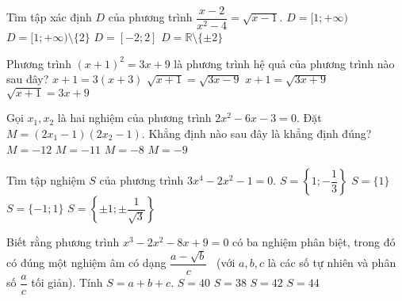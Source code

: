 \begin{ex}%
	Tìm tập xác định $D$ của phương trình $\dfrac{x-2}{x^2-4}=\sqrt{x-1}$.
	\choice
	{$D=[1;+\infty)$}
	{\True $D=[1;+\infty)\setminus \{2\}$}
	{$D=[-2;2]$}
	{$D=\mathbb{R}\setminus \{\pm2\}$}
\end{ex}
\begin{ex}%
	Phương trình $(x+1)^2=3x+9$ là phương trình hệ quả của phương trình nào sau đây?
	\choice
	{$x+1=3(x+3)$}
	{$\sqrt{x+1}=\sqrt{3x-9}$}
	{\True $x+1=\sqrt{3x+9}$}
	{$\sqrt{x+1}=3x+9$}
\end{ex}
\begin{ex}%
	Gọi $x_1, x_2$ là hai nghiệm của phương trình $2x^2-6x-3=0$. Đặt $M=(2x_1-1)(2x_2-1)$. Khẳng định nào sau đây là khẳng định đúng?
	\choice
	{$M=-12$}
	{$M=-11$}
	{\True $M=-8$}
	{$M=-9$}
\end{ex}
\begin{ex}%
	Tìm tập nghiệm $S$ của phương trình $3x^4-2x^2-1=0$.
	\choice
	{$S=\left\{1;-\dfrac{1}{3}\right\}$}
	{$S=\{1\}$}
	{\True $S=\{-1;1\}$}	
	{$S=\left\{\pm 1;\pm\dfrac{1}{\sqrt{3}}\right\}$}
\end{ex}
\begin{ex}%
	Biết rằng phương trình $x^3-2x^2-8x+9=0$ có ba nghiệm phân biệt, trong đó có đúng một nghiệm âm có dạng $\dfrac{a-\sqrt{b}}{c}$ \ (với $a, b, c$ là các số tự nhiên và phân số $\dfrac{a}{c}$ tối giản). Tính $S=a+b+c$.
	\choice
	{\True $S=40$}
	{$S=38$}
	{$S=42$}
	{$S=44$}
\end{ex}
